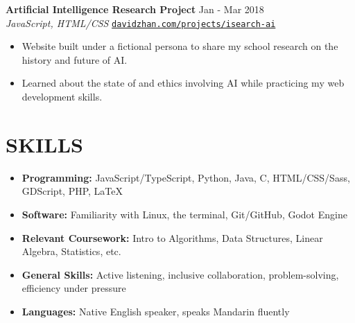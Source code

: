 \documentclass[letterpaper,10pt]{extarticle}
\begin{document}
\noindent
\textbf{Artificial Intelligence Research Project} \hfill Jan - Mar 2018 \\ %
\textit{JavaScript, HTML/CSS} \hfill \texttt{\href{https://davidzhan.com/projects/isearch-ai/}{davidzhan.com/projects/isearch-ai}}
\begin{itemize}
    \item Website built under a fictional persona to share my school research on the history and future of AI.
    \item Learned about the state of and ethics involving AI while practicing my web development skills.
\end{itemize}

\section*{SKILLS}
\begin{itemize}
    \item \textbf{Programming:} JavaScript/TypeScript, Python, Java, C, HTML/CSS/Sass, GDScript, PHP, \LaTeX
    \item \textbf{Software:} Familiarity with Linux, the terminal, Git/GitHub, Godot Engine
    \item \textbf{Relevant Coursework:} Intro to Algorithms, Data Structures, Linear Algebra, Statistics, etc.
    \item \textbf{General Skills:} Active listening, inclusive collaboration, problem-solving, efficiency under pressure
    \item \textbf{Languages:} Native English speaker, speaks Mandarin fluently
\end{itemize}

\end{document}
